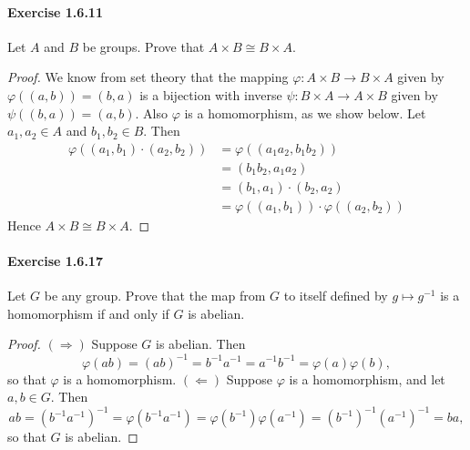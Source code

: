 \documentclass{article}
\theoremstyle{definition}
\begin{document}
\paragraph{Exercise 1.6.11} Let $A$ and $B$ be groups. Prove that $A \times B \cong B \times A$.
\begin{proof}
    We know from set theory that the mapping $\varphi: A \times B \rightarrow B \times A$ given by $\varphi((a, b))=(b, a)$ is a bijection with inverse $\psi: B \times A \rightarrow A \times B$ given by $\psi((b, a))=(a, b)$. Also $\varphi$ is a homomorphism, as we show below.
Let $a_1, a_2 \in A$ and $b_1, b_2 \in B$. Then
$$
\begin{aligned}
\varphi\left(\left(a_1, b_1\right) \cdot\left(a_2, b_2\right)\right) &=\varphi\left(\left(a_1 a_2, b_1 b_2\right)\right) \\
&=\left(b_1 b_2, a_1 a_2\right) \\
&=\left(b_1, a_1\right) \cdot\left(b_2, a_2\right) \\
&=\varphi\left(\left(a_1, b_1\right)\right) \cdot \varphi\left(\left(a_2, b_2\right)\right)
\end{aligned}
$$
Hence $A \times B \cong B \times A$.
\end{proof}



\paragraph{Exercise 1.6.17} Let $G$ be any group. Prove that the map from $G$ to itself defined by $g \mapsto g^{-1}$ is a homomorphism if and only if $G$ is abelian.
\begin{proof}
    $(\Rightarrow)$ Suppose $G$ is abelian. Then
$$
\varphi(a b)=(a b)^{-1}=b^{-1} a^{-1}=a^{-1} b^{-1}=\varphi(a) \varphi(b),
$$
so that $\varphi$ is a homomorphism.
$(\Leftarrow)$ Suppose $\varphi$ is a homomorphism, and let $a, b \in G$. Then
$$
a b=\left(b^{-1} a^{-1}\right)^{-1}=\varphi\left(b^{-1} a^{-1}\right)=\varphi\left(b^{-1}\right) \varphi\left(a^{-1}\right)=\left(b^{-1}\right)^{-1}\left(a^{-1}\right)^{-1}=b a,
$$
so that $G$ is abelian.
\end{proof}
\end{document}
